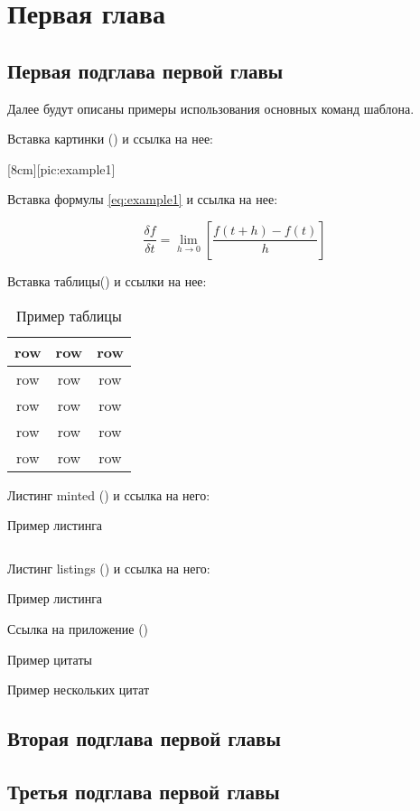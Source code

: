 \section{Первая глава}

\subsection{Первая подглава первой главы}
Далее будут описаны примеры использования основных команд шаблона.

Вставка картинки () и ссылка на нее:

[8cm][pic:example1]

Вставка формулы \eqref{eq:example1} и ссылка на нее:

\begin{equation}
    \label{eq:example1}
    \frac{\delta f}{\delta t} = \lim_{h \rightarrow 0} \left[ \frac{f (t + h) - f(t)}{h} \right]
\end{equation}

Вставка таблицы() и ссылки на нее:

\begin{table}[H]
    \centering
    \caption{Пример таблицы}
    \label{tbl:example1}
    \begin{tabular}{| c | c | c |}
        \hline
        row & row & row \\
        \hline
        row & row & row \\
        \hline
        row & row & row \\
        \hline
        row & row & row \\
        \hline
        row & row & row \\
        \hline
    \end{tabular}
\end{table}

Листинг minted () и ссылка на него:

\begin{listing}[H]
    \caption{Пример листинга}
    \label{code:example1}
    \inputminted[breaklines=true, framesep=10pt, fontsize=\footnotesize, firstline=1, lastline=8]{python}{listing/code_sample.py}
\end{listing}

Листинг listings () и ссылка на него:

\begin{listing}[H]
    \caption{Пример листинга}
    \label{code:example2}
    
\end{listing}

Ссылка на приложение ()

Пример цитаты \cite{domanovdi}

Пример нескольких цитат \cite{domanovdi,duportail:alu,fsrf40}

\subsection{Вторая подглава первой главы}

\subsection{Третья подглава первой главы}